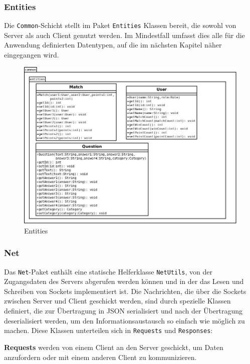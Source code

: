 \subsubsection{Entities}
Die \texttt{Common}-Schicht stellt im Paket \texttt{Entities} Klassen bereit, die sowohl von Server als auch Client genutzt werden. Im Mindestfall umfasst dies alle für die Anwendung definierten Datentypen, auf die im nächsten Kapitel näher eingegangen wird.

\begin{figure}[H]
	\centering
	\begin{minipage}[t]{\textwidth}
		\includegraphics[width=1\textwidth]{Diagramme/entities.jpeg}
		\caption{Entities}
		\label{Entities}
	\end{minipage}
\end{figure}

\subsubsection{Net}
Das \texttt{Net}-Paket enthält eine statische Helferklasse \texttt{NetUtils}, von der Zugangsdaten des Servers abgerufen werden können und in der das Lesen und Schreiben von Sockets implementiert ist. Die Nachrichten, die über die Sockets zwischen Server und Client geschickt werden, sind durch spezielle Klassen definiert, die zur Übertragung in JSON serialisiert und nach der Übertragung deserialisiert werden, um den Informationsaustausch so einfach wie möglich zu machen. Diese Klassen unterteilen sich in \texttt{Requests} und \texttt{Responses}:

\textbf{Requests} werden von einem Client an den Server geschickt, um Daten anzufordern oder mit einem anderen Client zu kommunizieren. 

